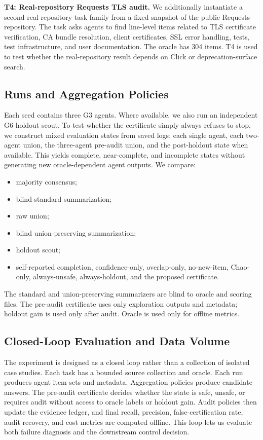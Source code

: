 \documentclass[letterpaper]{article}
\begin{document}
\textbf{T4: Real-repository Requests TLS audit.} We additionally instantiate a
second real-repository task family from a fixed snapshot of the public Requests
repository. The task asks agents to find line-level items related to TLS
certificate verification, CA bundle resolution, client certificates, SSL error
handling, tests, test infrastructure, and user documentation. The oracle has
304 items. T4 is used to test whether the real-repository result depends on
Click or deprecation-surface search.

\subsection{Runs and Aggregation Policies}

Each seed contains three G3 agents. Where available, we also run an independent
G6 holdout scout. To test whether the certificate simply always refuses to stop,
we construct mixed evaluation states from saved logs: each single agent, each
two-agent union, the three-agent pre-audit union, and the post-holdout state
when available. This yields complete, near-complete, and incomplete states
without generating new oracle-dependent agent outputs. We compare:

\begin{itemize}
    \item majority consensus;
    \item blind standard summarization;
    \item raw union;
    \item blind union-preserving summarization;
    \item holdout scout;
    \item self-reported completion, confidence-only, overlap-only, no-new-item,
    Chao-only, always-unsafe, always-holdout, and the proposed certificate.
\end{itemize}

The standard and union-preserving summarizers are blind to oracle and scoring
files. The pre-audit certificate uses only exploration outputs and metadata;
holdout gain is used only after audit. Oracle is used only for offline metrics.

\subsection{Closed-Loop Evaluation and Data Volume}

The experiment is designed as a closed loop rather than a collection of isolated
case studies. Each task has a bounded source collection and oracle. Each run
produces agent item sets and metadata. Aggregation policies produce candidate
answers. The pre-audit certificate decides whether the state is safe, unsafe, or
requires audit without access to oracle labels or holdout gain. Audit policies
then update the evidence ledger, and final recall, precision,
false-certification rate, audit recovery, and cost metrics are computed offline.
This loop lets us evaluate both failure diagnosis and the downstream control
decision.
\end{document}
